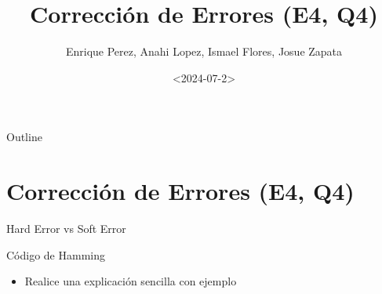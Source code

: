 \documentclass[presentation]{beamer}
\author{Enrique Perez, Anahi Lopez, Ismael Flores, Josue Zapata}
\date{<2024-07-2>}
\title{Corrección de Errores (E4, Q4)}
\begin{document}
\maketitle
\begin{frame}{Outline}
\tableofcontents
\end{frame}


\section{Corrección de Errores (E4, Q4)}
\label{sec:orgbca8b71}
\begin{frame}[label={sec:org074392b}]{Hard Error vs Soft Error}
\end{frame}
\begin{frame}[label={sec:org0e0608e}]{Código de Hamming}
\begin{itemize}
\item Realice una explicación sencilla con ejemplo
\end{itemize}
\end{frame}
\end{document}
